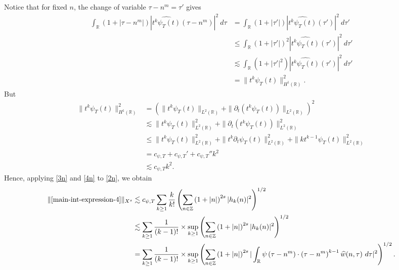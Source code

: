\documentclass[12pt,reqno]{amsart}
\numberwithin{equation}{section}  %
\numberwithin{figure}{section}
\newcommand{\rr}{\mathbb{R}}
\newcommand{\zz}{\mathbb{Z}}
\newcommand{\wh}{\widehat}
\newcommand{\p}{\partial}
\theoremstyle{plain}
\theoremstyle{definition}
\theoremstyle{remark}
\begin{document}
%
%
Notice that for fixed $n$, the change of variable $\tau - n^{m } = \tau'$
gives
%
%
\begin{equation}
	\label{3n}
	\begin{split}
		\int_\rr \left( 1 + | \tau - n^{m } | \right) | \wh{t^{k}
		\psi_{T}(t)}\left( \tau - n^{m } \right) |^2 \ d \tau
		& = \int_\rr \left( 1 + |\tau'| \right) | \wh{t^k \psi_{T}(t)}(\tau') |^2 \
		d \tau'
		\\
		& \le \int_\rr \left( 1 + |\tau'| \right)^2 | \wh{t^k \psi_{T}(t)}(\tau')
		|^2 \ d \tau'
		\\
		& \lesssim \int_\rr \left( 1 + | \tau' |^2 \right) | \wh{t^{k}
		\psi_{T}(t)}(\tau') |^2 \ d \tau'
		\\
		& = \|t^k \psi_{T}(t) \|_{H^1(\rr)}^2.
	\end{split}
\end{equation}
%
%
But
%
%
\begin{equation}
	\label{4n}
	\begin{split}
		\|t^k \psi_{T}(t) \|_{H^1(\rr)}^2
		& = \left( \|t^k \psi_{T}(t)\|_{L^2(\rr)} + \|\p_t \left( t^k \psi_{T}(t)
		\right)\|_{L^2(\rr)} \right)^2
		\\
		& \lesssim \|t^{k}\psi_{T}(t) \|_{L^2(\rr)}^2 + \|\p_t \left (t^{k}
		\psi_{T}(t) \right )\|_{L^2(\rr)}^2
		\\
		& \le \|t^k \psi_{T}(t) \|_{L^2(\rr)}^2 + \|t^k \p_t \psi_{T}(t)
		\|_{L^2(\rr)}^2 + \|k t^{k -1} \psi_{T}(t) \|_{L^2(\rr)}^2
		\\
		& = c_{\psi, T} + c_{\psi, T}' + c_{\psi, T}''k^2 
		\\
    & \lesssim c_{\psi, T} k^2.
	\end{split}
\end{equation}
%
%
Hence, applying \eqref{3n} and \eqref{4n} to \eqref{2n}, we obtain
%
\begin{equation}
	\label{5n}
	\begin{split}
		\|\eqref{main-int-expression-4} \|_{X^s}
		& \lesssim
    c_{\psi, T}\sum_{k \ge 1} \frac{k}{k!} \left( \sum_{n \in \zz} \left (1 + |n| \right )^{2s} | h_k(n) |^2 
		\right)^{1/2}
		\\
		& \lesssim \sum_{k \ge 1} \frac{1}{(k-1)!}
		\times \sup_{k \ge 1} \left( \sum_{n \in \zz} \left (1 + |n| \right )^{2s} | 
		h_k(n) |^2 \right)^{1/2}
		\\
		& = \sum_{k \ge 1} \frac{1}{(k-1)!} \times \sup_{k \ge 1} 
		\left( \sum_{n \in \zz} \left (1 + |n| \right )^{2s} |\int_\rr 
		\psi\left( \tau - n^{m } \right) \cdot \left( \tau - n^{m } 
    \right)^{k -1} \wh{w}(n, \tau) \ d \tau|^{2} \right)^{1/2}.
    	\end{split}
\end{equation}
\end{document}
